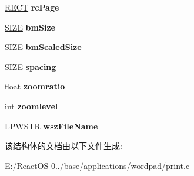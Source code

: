 \begin{DoxyCompactItemize}
\hyperlink{structtag_r_e_c_t}{R\+E\+CT} {\bfseries rc\+Page}
\item 
\mbox{\label{struct__previewinfo_a57f88ceff4d16eb302a28c9946abbffb}} 
\hyperlink{structtag_s_i_z_e}{S\+I\+ZE} {\bfseries bm\+Size}
\item 
\mbox{\label{struct__previewinfo_a07d649e6c18a37e0d803c7c73f902d04}} 
\hyperlink{structtag_s_i_z_e}{S\+I\+ZE} {\bfseries bm\+Scaled\+Size}
\item 
\mbox{\label{struct__previewinfo_a36085f88cdd6deac515eedad58607089}} 
\hyperlink{structtag_s_i_z_e}{S\+I\+ZE} {\bfseries spacing}
\item 
\mbox{\label{struct__previewinfo_a546ad473d06ceb263ded12790a731706}} 
float {\bfseries zoomratio}
\item 
\mbox{\label{struct__previewinfo_aa191feef75f649757acd4d9b6b2cb5a4}} 
int {\bfseries zoomlevel}
\item 
\mbox{\label{struct__previewinfo_a4bfc1353ed2d4fe5277636fe284e9518}} 
L\+P\+W\+S\+TR {\bfseries wsz\+File\+Name}
\end{DoxyCompactItemize}


该结构体的文档由以下文件生成\+:\begin{DoxyCompactItemize}
\item 
E\+:/\+React\+O\+S-\/0../base/applications/wordpad/print.\+c\end{DoxyCompactItemize}
